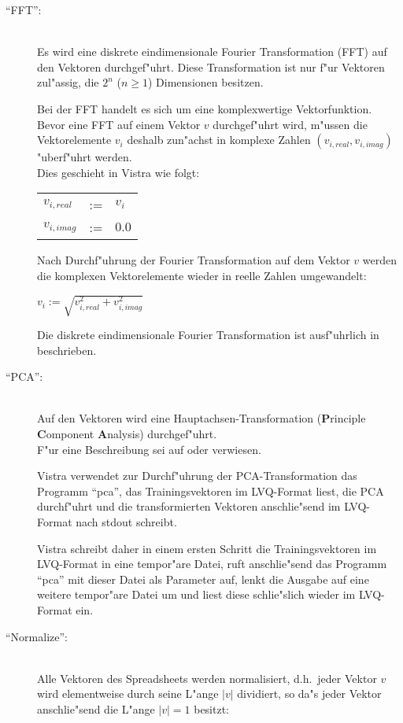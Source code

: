 \begin{description}
\item["`FFT"':] \mbox{} \\
Es wird eine diskrete eindimensionale 
Fourier Transformation (FFT) auf den Vektoren durchgef"uhrt.
Diese Transformation ist nur f"ur Vektoren zul"assig, die $2^{n}$ 
($n \geq 1$) Dimensionen besitzen.

Bei der FFT handelt es sich um eine komplexwertige Vektorfunktion.
Bevor eine FFT auf einem Vektor $v$ durchgef"uhrt wird, m"ussen die
Vektorelemente $v_{i}$ deshalb zun"achst in komplexe Zahlen 
$(v_{i,real},v_{i,imag})$ "uberf"uhrt werden. \\
Dies geschieht in Vistra wie folgt:

\begin{tabular}{@{\hspace*{1cm}}lcl}
$v_{i,real}$ & := & $v_{i}$ \\
$v_{i,imag}$ & := & $0.0$ \\
\end{tabular}

Nach Durchf"uhrung der Fourier Transformation auf dem Vektor $v$
werden die komplexen Vektorelemente wieder in reelle Zahlen umgewandelt:

\hspace*{1cm} $v_{i} := \sqrt{v_{i,real}^{2} + v_{i,imag}^{2}}$

Die diskrete eindimensionale Fourier Transformation ist ausf"uhrlich
in \cite{jaehne} beschrieben. 

\item["`PCA"':] \mbox{} \\ 
Auf den Vektoren wird eine 
Haupt\-achsen-Trans\-form\-ation 
({\bf P}rinciple {\bf C}om\-po\-nent {\bf A}na\-ly\-sis) 
durchgef"uhrt. \\
F"ur eine Beschreibung sei auf \cite{hertz} oder \cite{bronstein} verwiesen. 

Vistra verwendet zur Durchf"uhrung der PCA-Transformation das 
Programm "`pca"', das Trainingsvektoren im LVQ-Format liest, die PCA
durchf"uhrt und die transformierten Vektoren anschlie"send im LVQ-Format 
nach stdout schreibt. 

Vistra schreibt daher in einem ersten Schritt die Trainingsvektoren 
im LVQ-Format in eine tempor"are Datei, ruft anschlie"send das Programm 
"`pca"' mit dieser Datei als Parameter auf, lenkt die Ausgabe auf 
eine weitere tempor"are Datei um und liest diese 
schlie"slich wieder im LVQ-Format ein.

\item["`Normalize"':] \mbox{} \\
Alle Vektoren des Spreadsheets werden 
normalisiert, d.h.~jeder Vektor $v$ 
wird elementweise durch seine L"ange $|v|$ dividiert, so da"s jeder Vektor
anschlie"send die L"ange $|v|=1$ besitzt:
 

\end{description}
